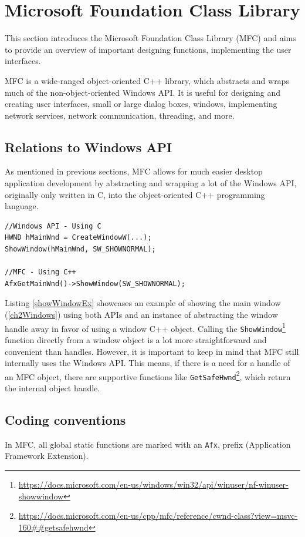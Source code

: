\section{Microsoft Foundation Class Library}
This section introduces the Microsoft Foundation Class Library (MFC) and aims to provide an overview of important designing functions, implementing the user interfaces.

MFC is a wide-ranged object-oriented C++ library, which abstracts and wraps much of the non-object-oriented Windows API. It is useful for designing and creating user interfaces, small or large dialog boxes, windows, implementing network services, network communication, threading, and more.\cite{MFCDesktop}

\subsection{Relations to Windows API}
As mentioned in previous sections, MFC allows for much easier desktop application development by abstracting and wrapping a lot of the Windows API, originally only written in C, into the object-oriented C++ programming language.

\begin{lstlisting}[caption={Showing a window using Windows API and MFC}, label=showWindowEx]
//Windows API - Using C
HWND hMainWnd = CreateWindowW(...);
ShowWindow(hMainWnd, SW_SHOWNORMAL);

//MFC - Using C++
AfxGetMainWnd()->ShowWindow(SW_SHOWNORMAL);
\end{lstlisting}

Listing \ref{showWindowEx} showcases an example of showing the main window (\ref{ch2Windows}) using both APIs and an instance of abstracting the window handle away in favor of using a window C++ object. Calling the \lstinline{ShowWindow}\footnote{\url{https://docs.microsoft.com/en-us/windows/win32/api/winuser/nf-winuser-showwindow}} function directly from a window object is a lot more straightforward and convenient than handles. However, it is important to keep in mind that MFC still internally uses the Windows API.
This means, if there is a need for a handle of an MFC object, there are supportive functions like \lstinline{GetSafeHwnd}\footnote{\url{https://docs.microsoft.com/en-us/cpp/mfc/reference/cwnd-class?view=msvc-160##getsafehwnd}}, which return the internal object handle.

\subsection{Coding conventions}
In MFC, all global static functions are marked with an \lstinline{Afx}, prefix (Application Framework Extension).

